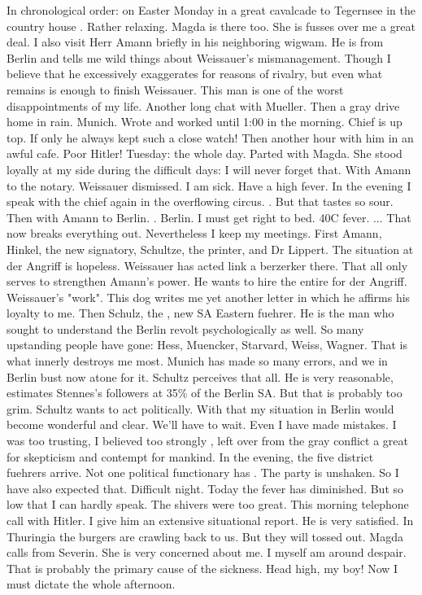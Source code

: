 ﻿In chronological order: on Easter Monday in a great cavalcade to Tegernsee in the country house . Rather relaxing. Magda is there too. She is fusses over me a great deal. I also visit Herr Amann briefly in his neighboring wigwam. He is from Berlin and tells me wild things about Weissauer's mismanagement. Though I believe that he excessively exaggerates for reasons of rivalry, but even what remains is enough to finish Weissauer. This man is one of the worst disappointments of my life. Another long chat with Mueller. Then a gray drive home in rain. Munich. Wrote and worked until 1:00 in the morning. Chief is up top. If only he always kept such a close watch! Then another hour with him in an awful cafe. Poor Hitler!
Tuesday:  the whole day. Parted with Magda. She stood loyally at my side during the difficult days: I will never forget that. With Amann to the notary. Weissauer dismissed. I am sick. Have a high fever. In the evening I speak with the chief again in the overflowing circus. . But that tastes so sour. Then with Amann to Berlin. . Berlin. I must get right to bed. 40C fever. ... That now breaks everything out. Nevertheless I keep my meetings. First Amann, Hinkel, the new signatory, Schultze, the printer, and Dr Lippert. The situation at der Angriff is hopeless. Weissauer has acted link a berzerker there. That all only serves to strengthen Amann's power. He wants to hire the entire  for der Angriff. Weissauer's "work". This dog writes me yet another letter in which he affirms his loyalty to me. Then Schulz, the , new SA Eastern fuehrer. He is the man who sought to understand the Berlin revolt psychologically as well. So many upstanding people have gone: Hess, Muencker, Starvard, Weiss, Wagner. That is what innerly destroys me most. Munich has made so many errors, and we in Berlin bust now atone for it. Schultz perceives that all. He is very reasonable, estimates Stennes's followers at 35\% of the Berlin SA. But that is probably too grim. Schultz wants to act politically. With that my situation in Berlin would become wonderful and clear. We'll have to wait. Even I have made mistakes. I was too trusting, I believed too strongly , left over from the gray conflict a great  for skepticism and contempt for mankind. In the evening, the five district fuehrers arrive. Not one political functionary has . The party is unshaken. So I have also expected that. Difficult night. Today the fever has diminished. But so low that I can hardly speak. The shivers were too great. This morning telephone call with Hitler. I give him an extensive situational report. He is very satisfied. In Thuringia the burgers are crawling back to us. But they will tossed out. Magda calls from Severin. She is very concerned about me. I myself am around despair. That is probably the primary cause of the sickness. Head high, my boy! Now I must dictate the whole afternoon.